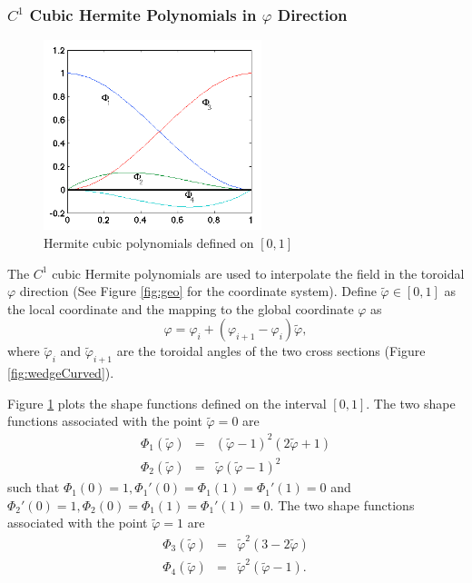\documentclass[11pt]{article}  %
\begin{document}
\subsubsection{$C^1$ Cubic Hermite Polynomials in $\varphi$ Direction}

\begin{figure}
\center
\includegraphics[width=2.5in]{fig/hermitecubic.png}
\caption{\small{Hermite cubic polynomials defined on $[0,1]$}} 
\label{fig:hermitecubic}
\end{figure}

The $C^1$ cubic Hermite polynomials are used to interpolate the field in the toroidal $\varphi$ direction (See Figure \ref{fig:geo} for the coordinate system).  Define $\tilde{\varphi}\in[0,1]$ as the local coordinate and the mapping to the global coordinate $\varphi$ as
\begin{equation}
\varphi = \varphi_{i} + (\varphi_{i+1}-\varphi_{i})\tilde{\varphi},
\end{equation}
where $\tilde{\varphi}_{i}$ and $\tilde{\varphi}_{i+1}$ are the toroidal angles of the two cross sections (Figure \ref{fig:wedgeCurved}).

Figure \ref{fig:hermitecubic} plots the shape functions defined on the interval $[0,1]$. The two shape functions associated with the point $\tilde{\varphi}=0$ are
\begin{eqnarray}
\Phi_1(\tilde{\varphi})&=&(\tilde{\varphi}-1)^2(2\tilde{\varphi}+1) \\
\Phi_2(\tilde{\varphi})&=&\tilde{\varphi}(\tilde{\varphi}-1)^2
\end{eqnarray}
such that $\Phi_1(0)=1,\Phi_1'(0)=\Phi_1(1)=\Phi_1'(1)=0$ 
and  $\Phi_2'(0)=1,\Phi_2(0)=\Phi_1(1)=\Phi_1'(1)=0$. The two shape functions associated with the point $\tilde{\varphi}=1$ are 
\begin{eqnarray}
\Phi_3(\tilde{\varphi})&=&\tilde{\varphi}^2(3-2\tilde{\varphi}) \\
\Phi_4(\tilde{\varphi})&=&\tilde{\varphi}^2(\tilde{\varphi}-1).
\end{eqnarray}
\end{document}
